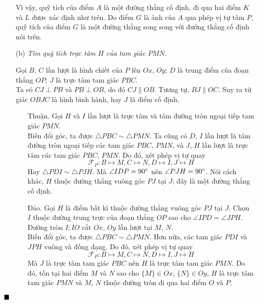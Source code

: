 \documentclass{article} %
\newenvironment{solution}[1][Lời giải]{%
  \proof[\faPenNib \hspace{0.2cm} \ttfamily \scshape \large #1]%
}{\(\hfill \blacksquare\){\parfillskip0pt\par}}
\begin{document}
\begin{solution}
\begin{enumerate}
                Vì vậy, quỹ tích của điểm \(A\) là một đường thẳng cố định, đi qua hai điểm \(K\) và \(L\) được xác định như trên. Do điểm \(G\) là ảnh của \(A\) qua phép vị tự tâm \(P\), quỹ tích của điểm \(G\) là một đường thẳng song song với đường thẳng cố định nói trên.

                \item[(b)] \textit{Tìm quỹ tích trực tâm \(H\) của tam giác \(PMN\).}

                Gọi \(B\), \(C\) lần lượt là hình chiết của \(P\) lên \(Ox\), \(Oy\); \(D\) là trung điểm của đoạn thẳng \(OP\); \(J\) là trực tâm tam giác \(PBC\).\\
                Ta có \(CJ \perp PB\) và \(PB \perp OB\), do đó \(CJ \parallel OB\). Tương tự, \(BJ \parallel OC\). Suy ra tứ giác \(OBJC\) là hình bình hành, hay \(J\) là điểm cố định.

                \begin{enumerate}[leftmargin=1.25cm]
                
                    \item[Thuận.] Gọi \(H\) và \(I\) lần lượt là trực tâm và tâm đường tròn ngoại tiếp tam giác \(PMN\).\\
                    Biến đổi góc, ta được \(\triangle PBC \sim \triangle PMN\). Ta cũng có \(D\), \(I\) lần lượt là tâm đường tròn ngoại tiếp các tam giác \(PBC\), \(PMN\), và \(J\), \(H\) lần lượt là trực tâm các tam giác \(PBC\), \(PMN\). Do đó, xét phép vị tự quay
                    \[\mathcal{F}_{P}: B \mapsto M, C \mapsto N, D \mapsto I, J \mapsto H\]
                    Hay \(\triangle PDI \sim \triangle PJH\). Mà \(\angle IDP = 90 \degree\) nên \(\angle PJH = 90 \degree\). Nói cách khác, \(H\) thuộc đường thẳng vuông góc \(PJ\) tại \(J\); đây là một đường thẳng cố định.

                    \item[Đảo.] Gọi \(H\) là điểm bất kì thuộc đường thẳng vuông góc \(PJ\) tại \(J\). Chọn \(I\) thuộc đường trung trực của đoạn thẳng \(OP\) sao cho \(\angle IPD = \angle JPH\). Đường tròn \(I;IO\) cắt \(Ox\), \(Oy\) lần lượt tại \(M\), \(N\).\\
                    Biến đổi góc, ta được \(\triangle PBC \sim \triangle PMN\). Hơn nữa, các tam giác \(PDI\) và \(JPH\) vuông và đồng dạng. Do đó, xét phép vị tự quay
                    \[\mathcal{F}_{P}: B \mapsto M, C \mapsto N, D \mapsto I, J \mapsto H\]
                    Mà \(J\) là trực tâm tam giác \(PBC\) nên \(H\) là trực tâm tam giác \(PMN\). Do đó, tồn tại hai điểm \(M\) và \(N\) sao cho \(\{M\} \in Ox\), \(\{N\} \in Oy\), \(H\) là trực tâm tam giác \(PMN\) và \(M\), \(N\) thuộc đường tròn đi qua hai điểm \(O\) và \(P\).
                

\end{enumerate}
\end{enumerate}
\end{solution}
\end{document}
